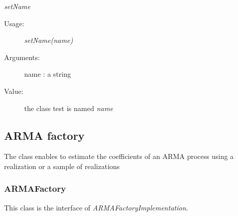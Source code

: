 \begin{description}
\begin{description}
\item \textit{setName}
\begin{description}
\item[Usage:] \textit{setName(name)}
\item[Arguments:] name : a string
\item[Value:] the class test is named \textit{name}
\end{description}
\bigskip

\end{description}

\end{description}



\newpage
\subsection{ARMA factory}

The class enables to estimate the coefficients of an ARMA process using a realization or a sample of realizations

\subsubsection{ARMAFactory}

This class is the interface of \textit{ARMAFactoryImplementation}.\\

